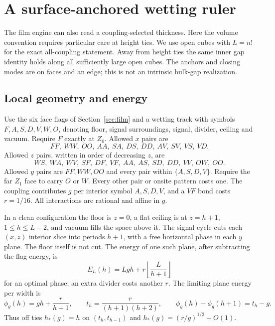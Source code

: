 \section{A surface-anchored wetting ruler}\label{sec:wetting}
The film engine can also read a coupling-selected thickness. Here the
volume convention requires particular care at height ties. We use
open cubes with $L=n!$ for the exact all-coupling statement. Away
from height ties the same inner gap identity holds along all
sufficiently large open cubes. The anchors and closing modes are
on faces and an edge; this is not an intrinsic bulk-gap realization.

\subsection{Local geometry and energy}
Use the six face flags of Section~\ref{sec:film} and a wetting track
with symbols $F,A,S,D,V,W,O$, denoting floor, signal surroundings,
signal, divider, ceiling and vacuum. Require $F$ exactly at $Z_0$.
Allowed $x$ pairs are
\[
 FF,\ WW,\ OO,\ AA,\ SA,\ DS,\ DD,\ AV,\ SV,\ VS,\ VD.
\]
Allowed $z$ pairs, written in order of decreasing $z$, are
\[
 WS,\ WA,\ WV,\ SF,\ DF,\ VF,\ AA,\ AS,\ SD,\ DD,\ VV,\ OW,\ OO.
\]
Allowed $y$ pairs are $FF,WW,OO$ and every pair within
$\{A,S,D,V\}$. Require the far $Z_1$ face to carry $O$ or $W$.
Every other pair or onsite pattern costs one. The coupling contributes
$g$ per interior symbol $A,S,D,V$, and a $VF$ bond costs $r=1/16$.
All interactions are rational and affine in $g$.

In a clean configuration the floor is $z=0$, a flat ceiling is at
$z=h+1$, $1\leq h\leq L-2$, and vacuum fills the space above it.
The signal cycle cuts each $(x,z)$ interior slice into periods
$h+1$, with a free horizontal phase in each $y$ plane. The
floor itself is not cut. The energy of one such plane, after
subtracting the flag energy, is
\begin{equation}\label{eq:wetting-row}
 E_L(h)=Lgh+r\left\lfloor\frac{L}{h+1}\right\rfloor
\end{equation}
for an optimal phase; an extra divider costs another $r$.
The limiting plane energy per width is
\begin{equation}\label{eq:wetting-phi}
 \phi_g(h)=gh+\frac{r}{h+1},\qquad
 t_h=\frac{r}{(h+1)(h+2)},\qquad
 \phi_g(h)-\phi_g(h+1)=t_h-g.
\end{equation}
Thus off ties $h_*(g)=h$ on $(t_h,t_{h-1})$ and
$h_*(g)=(r/g)^{1/2}+O(1)$.

